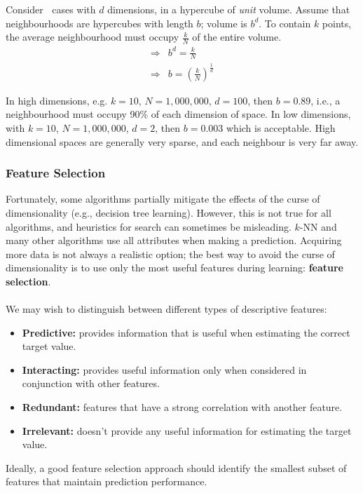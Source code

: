 \documentclass[a4paper,11pt]{article}
\begin{document}
Consider $~$ cases with $d$ dimensions, in a hypercube of \textit{unit} volume.
Assume that neighbourhoods are hypercubes with length $b$; volume is $b^d$.
To contain $k$ points, the average neighbourhood must occupy $\frac{k}{N}$ of the entire volume.
\begin{align*}
    \Rightarrow& b^d = \frac{k}{N} \\
    \Rightarrow& b = \left( \frac{k}{N}\right)^\frac{1}{d} 
\end{align*}

In high dimensions, e.g. $k=10$, $N=1,000,000$, $d=100$, then $b = 0.89$, i.e., a neighbourhood must occupy 90\% of each dimension of space.
In low dimensions, with $k=10$, $N=1,000,000$, $d=2$, then $b= 0.003$ which is acceptable.
High dimensional spaces are generally very sparse, and each neighbour is very far away.

\subsubsection{Feature Selection}
Fortunately, some algorithms partially mitigate the effects of the curse of dimensionality (e.g., decision tree learning).
However, this is not true for all algorithms, and heuristics for search can sometimes be misleading.
$k$-NN and many other algorithms use all attributes when making a prediction.
Acquiring more data is not always a realistic option; the best way to avoid the curse of dimensionality is to use only the most useful features during learning: \textbf{feature selection}.
\\\\
We may wish to distinguish between different types of descriptive features:
\begin{itemize}
    \item   \textbf{Predictive:} provides information that is useful when estimating the correct target value.
    \item   \textbf{Interacting:} provides useful information only when considered in conjunction with other features.
    \item   \textbf{Redundant:} features that have a strong correlation with another feature.
    \item   \textbf{Irrelevant:} doesn't provide any useful information for estimating the target value.
\end{itemize}

Ideally, a good feature selection approach should identify the smallest subset of features that maintain prediction performance.
\end{document}
